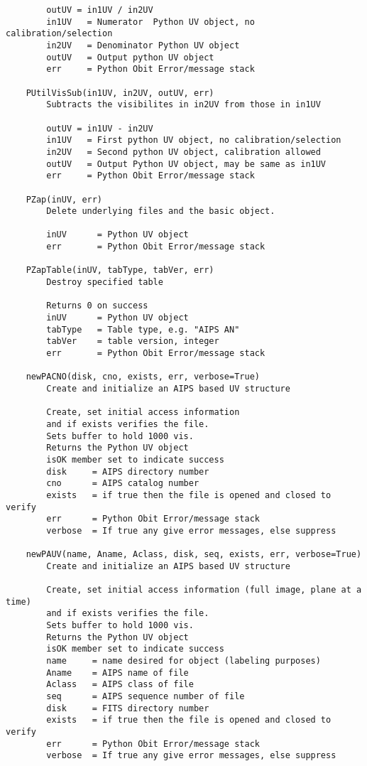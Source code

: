 \documentclass[11pt]{report}
\begin{document}
\begin{verbatim}
        outUV = in1UV / in2UV
        in1UV   = Numerator  Python UV object, no calibration/selection
        in2UV   = Denominator Python UV object
        outUV   = Output python UV object
        err     = Python Obit Error/message stack
    
    PUtilVisSub(in1UV, in2UV, outUV, err)
        Subtracts the visibilites in in2UV from those in in1UV
        
        outUV = in1UV - in2UV
        in1UV   = First python UV object, no calibration/selection
        in2UV   = Second python UV object, calibration allowed
        outUV   = Output Python UV object, may be same as in1UV
        err     = Python Obit Error/message stack
    
    PZap(inUV, err)
        Delete underlying files and the basic object.
        
        inUV      = Python UV object
        err       = Python Obit Error/message stack
    
    PZapTable(inUV, tabType, tabVer, err)
        Destroy specified table
        
        Returns 0 on success
        inUV      = Python UV object
        tabType   = Table type, e.g. "AIPS AN"
        tabVer    = table version, integer
        err       = Python Obit Error/message stack
    
    newPACNO(disk, cno, exists, err, verbose=True)
        Create and initialize an AIPS based UV structure
        
        Create, set initial access information 
        and if exists verifies the file.
        Sets buffer to hold 1000 vis.
        Returns the Python UV object
        isOK member set to indicate success
        disk     = AIPS directory number
        cno      = AIPS catalog number
        exists   = if true then the file is opened and closed to verify
        err      = Python Obit Error/message stack
        verbose  = If true any give error messages, else suppress
    
    newPAUV(name, Aname, Aclass, disk, seq, exists, err, verbose=True)
        Create and initialize an AIPS based UV structure
        
        Create, set initial access information (full image, plane at a time)
        and if exists verifies the file.
        Sets buffer to hold 1000 vis.
        Returns the Python UV object
        isOK member set to indicate success
        name     = name desired for object (labeling purposes)
        Aname    = AIPS name of file
        Aclass   = AIPS class of file
        seq      = AIPS sequence number of file
        disk     = FITS directory number
        exists   = if true then the file is opened and closed to verify
        err      = Python Obit Error/message stack
        verbose  = If true any give error messages, else suppress
    

\end{verbatim}
\end{document}
